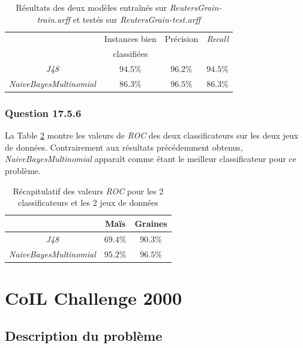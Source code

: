 \documentclass[11pt,a4paper]{article}
\begin{document}
			  \begin{table}[h]
			  	\centering
			  	\caption{Résultats des deux modèles entraînés sur \textit{ReutersGrain-train.arff} et testés sur \textit{ReutersGrain-test.arff}}
			  	\label{tab:grain}
			  	\begin{tabular}{|c|c|c|c|}
			  		\hline
			  		&Instances bien  & Précision & \textit{Recall}\\
			  		& classifiées  &  & \\ 
			  		\hline
			  		\textit{J48} & $94.5 \%$ & $96.2\%$ & $94.5\%$ \\
			  		\hline
			  		\textit{NaiveBayesMultinomial}& $86.3\%$ & $96.5\%$ & $86.3\%$ \\
			  		\hline
			  	\end{tabular}
			  \end{table}
			  
			  \subsubsection*{Question 17.5.6}
			  
			  La Table \ref{tab:text:ROC} montre les valeurs de \textit{ROC} des deux classificateurs sur les deux jeux de données. Contrairement aux résultats précédemment obtenus, \textit{NaiveBayesMultinomial} apparaît comme étant le meilleur classificateur pour ce problème.
			  
			  \begin{table}[h]
			  	\centering
			  	\caption{Récapitulatif des valeurs \textit{ROC} pour les 2 classificateurs et les 2 jeux de données}
			  	\label{tab:text:ROC}
			  	\begin{tabular}{|c|c|c|}
			  		\hline
			  		& Maïs & Graines \\
			  		\hline
			  		\textit{J48} & $69.4\%$ & $90.3\%$\\
			  		\hline
			  		\textit{NaiveBayesMultinomial} & $95.2\%$ & $96.5\%$\\
			  		\hline
			  	\end{tabular}
			  \end{table}
   	
   	\section{CoIL Challenge 2000}
   	
	   	\subsection{Description du problème}
	   	
\end{document}
